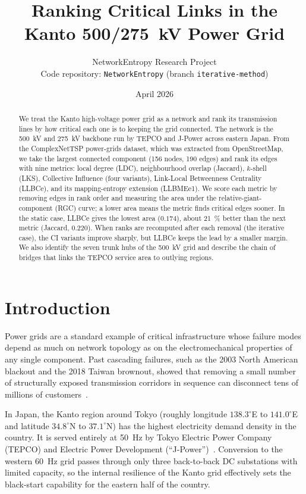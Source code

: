 \documentclass[11pt,a4paper]{article}
\title{Ranking Critical Links in the Kanto
500/275~kV Power Grid}
\author{NetworkEntropy Research Project\\
\small{Code repository: \texttt{NetworkEntropy} (branch \texttt{iterative-method})}}
\date{April 2026}
\begin{document}
\maketitle

\begin{abstract}
We treat the Kanto high-voltage power grid as a network and rank its
transmission lines by how critical each one is to keeping the grid
connected. The network is the \SI{500}{\kilo\volt} and
\SI{275}{\kilo\volt} backbone run by TEPCO and J-Power across eastern
Japan. From the ComplexNetTSP power-grids dataset, which was extracted
from OpenStreetMap, we take the largest connected component
(\num{156} nodes, \num{190} edges) and rank its edges with nine metrics:
local degree (LDC), neighbourhood overlap (Jaccard), $k$-shell (LKS),
Collective Influence (four variants), Link-Local Betweenness Centrality
(LLBCe), and its mapping-entropy extension (LLBMEe1). We score each
metric by removing edges in rank order and measuring the area under the
relative-giant-component (RGC) curve; a lower area means the metric
finds critical edges sooner. In the static case, LLBCe gives the lowest
area ($0.174$), about \SI{21}{\percent} better than the next metric
(Jaccard, $0.220$). When ranks are recomputed after each removal (the
iterative case), the CI variants improve sharply, but LLBCe keeps the
lead by a smaller margin. We also identify the seven trunk hubs of the
\SI{500}{\kilo\volt} grid and describe the chain of bridges that links
the TEPCO service area to outlying regions.
\end{abstract}

\section{Introduction}
\label{sec:intro}

Power grids are a standard example of critical infrastructure whose
failure modes depend as much on network topology as on the
electromechanical properties of any single component. Past cascading
failures, such as the 2003 North American blackout and the 2018 Taiwan
brownout, showed that removing a small number of structurally exposed
transmission corridors in sequence can disconnect tens of millions of
customers~\cite{albert2004structural,buldyrev2010catastrophic}.

In Japan, the Kanto region around Tokyo (roughly longitude
$138.3^{\circ}$E to $141.0^{\circ}$E and latitude $34.8^{\circ}$N to
$37.1^{\circ}$N) has the highest electricity demand density in the
country. It is served entirely at \SI{50}{\hertz} by Tokyo Electric
Power Company (TEPCO) and Electric Power Development
(``J-Power'')~\cite{tepco2024network}. Conversion to the western
\SI{60}{\hertz} grid passes through only three back-to-back DC
substations with limited capacity, so the internal resilience of the
Kanto grid effectively sets the black-start capability for the eastern
half of the country.
\end{document}
